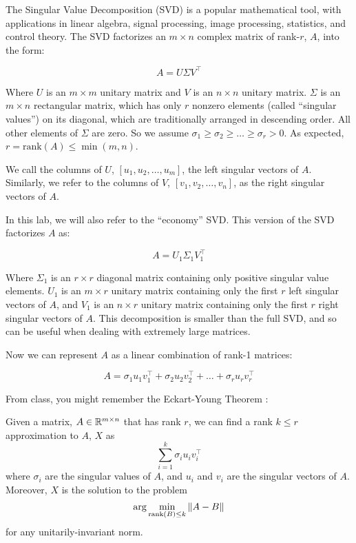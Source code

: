 The Singular Value Decomposition (SVD) is a popular mathematical tool, with applications in linear algebra, signal processing, image processing, statistics, and control theory. The SVD factorizes an $m\times n$ complex matrix of rank-$r$, $A$, into the form:

\[ A = U \Sigma V^\intercal \]

Where $U$ is an $m\times m$ unitary matrix and $V$ is an $n \times n$ unitary matrix. $\Sigma$ is an $m \times n$ rectangular matrix, which has only $r$ nonzero elements (called ``singular values'') on its diagonal, which are traditionally arranged in descending order. All other elements of $\Sigma$ are zero. So we assume $\sigma_1 \geq \sigma_2 \geq \ldots \geq \sigma_r > 0$. As expected, $r = \mathrm{rank}(A) \leq \min(m,n)$.

We call the columns of $U$, $[u_1, u_2, \ldots, u_m]$, the left singular vectors of $A$. Similarly, we refer to the columns of $V$, $[v_1, v_2, \ldots, v_n]$, as the right singular vectors of $A$.

In this lab, we will also refer to the ``economy'' SVD. This version of the SVD factorizes $A$ as:

\[ A = U_1 \Sigma_1 V_1^\intercal \]

Where $\Sigma_1$ is an $r \times r$ diagonal matrix containing only positive singular value elements. $U_1$ is an $m \times r$ unitary matrix containing only the first $r$ left singular vectors of $A$, and $V_1$ is an $n \times r$ unitary matrix containing only the first $r$ right singular vectors of $A$. This decomposition is smaller than the full SVD, and so can be useful when dealing with extremely large matrices.

Now we can represent $A$ as a linear combination of rank-1 matrices:

\[ A = \sigma_1 u_1 v_1^\intercal + \sigma_2 u_2 v_2^\intercal + \ldots + \sigma_r u_r v_r^\intercal \]

From class, you might remember the Eckart-Young Theorem \cite{Eckart1936}:

\begin{theorem}
	Given a matrix, $A \in \mathbb{R}^{m \times n}$ that has rank $r$, we can find a rank $k \leq r$ approximation to $A$, $X$ as
	$$\sum_{i = 1}^k \sigma_i u_i v_i^\top$$
	where $\sigma_i$ are the singular values of $A$, and $u_i$ and $v_i$ are the singular vectors of $A$. Moreover, $X$ is  the solution to the problem
	$$\arg \min_{\mathrm{rank}\left(B\right) \leq k} \|A - B\|$$
	for any unitarily-invariant norm.
	\label{thm:eckart-young}
\end{theorem}

